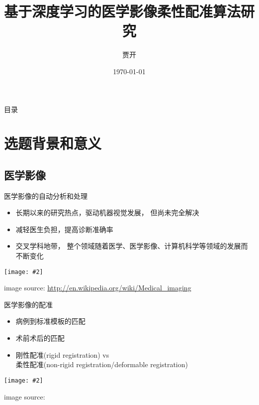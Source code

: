 \documentclass {beamer}
\title{基于深度学习的医学影像柔性配准算法研究}
\author {贾开}
\institute {清华大学}
\date{\today}
\newcommand{\addgraph}[2]{\begin{center}
\texttt{[image: \#2]}\end{center}}
\begin{document}



\begin{frame}{目录}
    \tableofcontents
\end{frame}

\section{选题背景和意义}

\subsection{医学影像}

\begin{frame}{医学影像的自动分析和处理}
    \begin{itemize}
        \item 长期以来的研究热点，驱动机器视觉发展，
            但尚未完全解决
        \item 减轻医生负担，提高诊断准确率
        \item 交叉学科地带，
            整个领域随着医学、医学影像、计算机科学等领域的发展而不断变化
    \end{itemize}
    \addgraph{0.3}{res/mi-concept.jpg}
    \tiny{image source:
        \url{http://en.wikipedia.org/wiki/Medical\_imaging}}
\end{frame}


\begin{frame}{医学影像的配准}
    \begin{itemize}
        \item 病例到标准模板的匹配
        \item 术前术后的匹配
        \item 刚性配准(rigid registration) vs \\
            柔性配准(non-rigid
            registration/deformable registration)
    \end{itemize}
    \addgraph{0.5}{res/example-brain.png}
    \tiny{image source: \cite{shen2007image}}
\end{frame}
\end{document}
